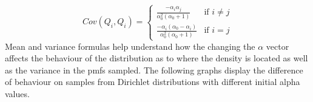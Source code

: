 \documentclass[twoside,hidelinks]{article}
\begin{document}
\begin{equation}
 Cov(Q_i,Q_i) =
\left\{
	\begin{array}{ll}
		\frac{ - \alpha_i \alpha_j }{ \alpha_0^2 ( \alpha_0+1) }                   & \mbox{if } i \neq j  \\
		\frac{ - \alpha_i ( \alpha_0 - \alpha_i) }{ \alpha_0^2 ( \alpha_0+1)} & \mbox{if } i=j
	\end{array}
\right.
\end{equation}
Mean and variance formulas help understand how the changing the $ \alpha $ vector affects the behaviour of the distribution as to where the density is located as well as the variance in the pmfs sampled. The following graphs display the difference of behaviour on samples from Dirichlet distributions with different initial alpha values.
\end{document}
